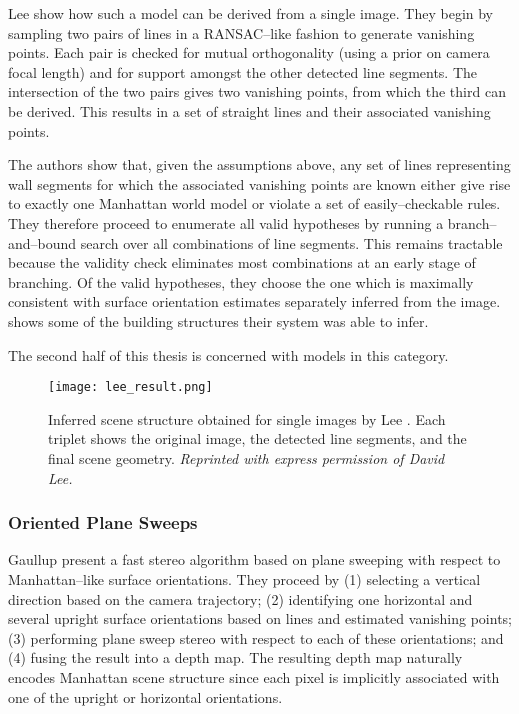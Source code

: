 Lee \etal show how such a model can be derived from a single
image. They begin by sampling two pairs of lines in a RANSAC--like
fashion to generate vanishing points. Each pair is checked for mutual
orthogonality (using a prior on camera focal length) and for support
amongst the other detected line segments. The intersection of the two
pairs gives two vanishing points, from which the third can be
derived. This results in a set of straight lines and their associated
vanishing points.

The authors show that, given the assumptions above, any set of lines
representing wall segments for which the associated vanishing points
are known either give rise to exactly one Manhattan world model or
violate a set of easily--checkable rules. They therefore proceed to
enumerate all valid hypotheses by running a branch--and--bound search
over all combinations of line segments. This remains tractable because
the validity check eliminates most combinations at an early stage of
branching. Of the valid hypotheses, they choose the one which is
maximally consistent with surface orientation estimates separately
inferred from the image.  shows some of the
building structures their system was able to infer.

The second half of this thesis is concerned with models in this
category.

\begin{figure}[tb]
  \centering
  \texttt{[image: lee\_result.png]}
  \caption{Inferred scene structure obtained for single images by Lee
    \etal \cite{Lee09}. Each triplet shows the original image, the
    detected line segments, and the final scene geometry.
    \textit{Reprinted with express permission of David Lee.}
  }
  \label{fig:lee-result}
\end{figure}

\subsubsection{Oriented Plane Sweeps}

Gaullup \etal \cite{Gallup2007} present a fast stereo algorithm based
on plane sweeping with respect to Manhattan--like surface
orientations. They proceed by (1) selecting a vertical direction based
on the camera trajectory; (2) identifying one horizontal and several
upright surface orientations based on lines and estimated vanishing
points; (3) performing plane sweep stereo with respect to each of
these orientations; and (4) fusing the result into a depth map. The
resulting depth map naturally encodes Manhattan scene structure since
each pixel is implicitly associated with one of the upright or
horizontal orientations.\changedsinceviva

